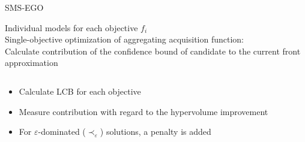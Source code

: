 \documentclass[11pt,compress,t,notes=noshow, xcolor=table]{beamer}
\begin{document}
\begin{frame}{SMS-EGO}

Individual models for each objective $f_i$\\
\vspace{1em}
Single-objective optimization of aggregating acquisition function: \\
Calculate contribution of the confidence bound of candidate to the current front approximation

\begin{columns}

\begin{column}{0.55\textwidth}
\begin{itemize}
  \item Calculate LCB for each objective
  \item Measure contribution with regard to the hypervolume improvement
  \item For $\varepsilon$-dominated ($\prec_{\varepsilon}$) solutions, a penalty is added
\end{itemize}
\vfill
\end{column}

\begin{column}{0.45\textwidth}


\end{column}
\end{columns}
\end{frame}
\end{document}
